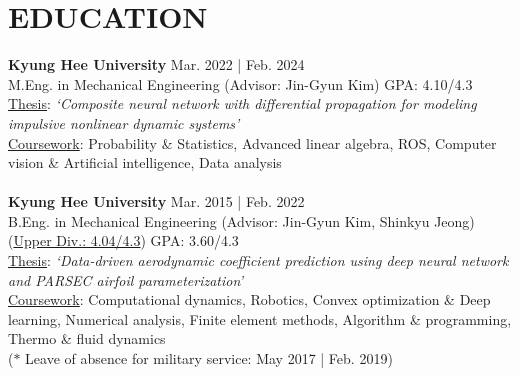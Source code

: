 \documentclass[a4paper,10pt]{extarticle}
\begin{document}
\section*{EDUCATION}
\noindent
\textbf{Kyung Hee University} \hfill Mar. 2022 | Feb. 2024\\ %
M.Eng. in Mechanical Engineering {\small(Advisor: Jin-Gyun Kim)} \hfill GPA: 4.10/4.3\\ %
\underline{Thesis}: \textsl{{\small `Composite neural network with differential propagation for modeling impulsive nonlinear dynamic systems'}}\\
{\small\underline{Coursework}: Probability \& Statistics, Advanced linear algebra, ROS, Computer vision \& Artificial intelligence, Data analysis}\\
\\
\textbf{Kyung Hee University} \hfill Mar. 2015 | Feb. 2022\\ %
B.Eng. in Mechanical Engineering {\small(Advisor: Jin-Gyun Kim, Shinkyu Jeong)}\hfill {(\ul{Upper Div.: 4.04/4.3})} GPA: 3.60/4.3\\ %
\underline{Thesis}: {\small\textsl{{`Data-driven aerodynamic coefficient prediction using deep neural network and PARSEC airfoil parameterization'}}}\\  %
{\small\underline{Coursework}: Computational dynamics, Robotics, Convex optimization \& Deep learning, Numerical analysis, Finite element methods, Algorithm \& programming, Thermo \& fluid dynamics}\\
{\footnotesize{($*$ Leave of absence for military service: May 2017 | Feb. 2019)}}

\end{document}
